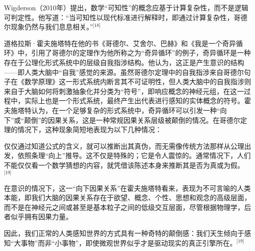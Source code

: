 Wigderson（2010年）提出，数学“可知性”的概念应基于计算复杂性，而不是逻辑可判定性。他写道：“当可知性以现代标准进行解释时，即通过计算复杂性，哥德尔现象仍然与我们息息相关。”\(^\text{[18]}\)

道格拉斯·霍夫施塔特在他的书《哥德尔、艾舍尔、巴赫》和《我是一个奇异循环》中，引用了哥德尔的定理作为他所称之为“奇异循环”的例子，奇异循环是一种存在于公理化形式系统中的层级自我指涉结构。他认为，这正是产生意识的结构——即人类大脑中“自我”感觉的来源。虽然哥德尔定理中的自我指涉来自哥德尔句子在《数学原理》这一形式系统内断言其不可证明性，但人类大脑中的自我指涉则来自于大脑如何将刺激抽象化并分类为“符号”，即响应概念的神经元组，在这一过程中，实际上也是一个形式系统，最终产生出代表进行感知的实体概念的符号。霍夫施塔特认为，在一个足够复杂的形式系统中，奇异循环可以引发一种“向下”或“颠倒”的因果关系，这是一种常规因果关系层级被颠倒的情况。在哥德尔定理的情况下，这种现象简短地表现为以下几种情况：

仅仅通过知道公式的含义，就可以推断出其真伪，而无需像传统方法那样从公理出发，依照条理“向上”推导。这不仅是特殊的；它是令人震惊的。通常情况下，人们不能仅仅看一个数学猜想的内容，就凭借该陈述本身来推断其是否为真或为假。\(^\text{[19]}\)

在意识的情况下，这一“向下因果关系”在霍夫施塔特看来，表现为不可言喻的人类本能，即我们大脑的因果关系存在于欲望、概念、个性、思想和观念的高级层面，而不是在神经元之间或甚至是基本粒子之间的低级交互层面，尽管根据物理学，后者似乎拥有因果力量。

因此，我们正常的人类感知世界的方式具有一种奇特的颠倒感：我们天生倾向于感知“大事物”而非“小事物”，即使微观世界似乎才是驱动现实的真正引擎所在。\(^\text{[19]}\)
